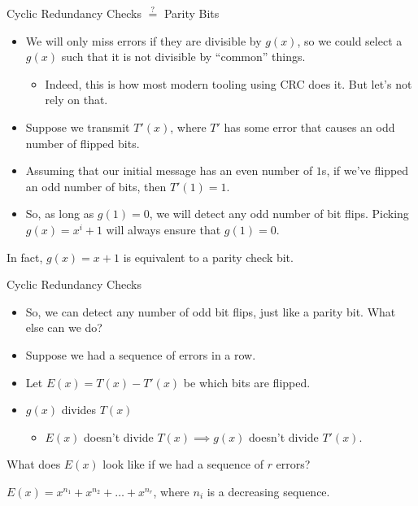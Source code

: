 \documentclass[aspectratio=169]{beamer}
\begin{document}
\begin{frame}{Cyclic Redundancy Checks $\stackrel{?}{=}$ Parity Bits}
    \begin{itemize}
        \item We will only miss errors if they are divisible by $g(x)$, so we could select a $g(x)$ such that it is not divisible by ``common'' things. \pause 
        \begin{itemize}
            \item Indeed, this is how most modern tooling using CRC does it. But let's not rely on that. \pause 
        \end{itemize}
        \item Suppose we transmit $T'(x)$, where $T'$ has some error that causes an odd number of flipped bits. \pause
        \item  Assuming that our initial message has an even number of $1$s, if we've flipped an odd number of bits, then $T'(1) = 1$.
        \item So, as long as $g(1) = 0$, we will detect any odd number of bit flips. Picking $g(x) = x^i + 1$ will always ensure that $g(1) = 0$. \pause 
    \end{itemize} 

    In fact, $g(x) = x + 1$ is equivalent to a parity check bit.  
\end{frame}

\begin{frame}{Cyclic Redundancy Checks}
    \begin{itemize}
        \item So, we can detect any number of odd bit flips, just like a parity bit. What else can we do? 
        \item Suppose we had a sequence of errors in a row. 
        \item Let $E(x) = T(x) - T'(x)$ be which bits are flipped. \pause
        \item $g(x)$ divides $T(x)$ 
        \begin{itemize}
            \item $E(x)$ doesn't divide $T(x) \implies g(x)$ doesn't divide $T'(x)$.
        \end{itemize}
    \end{itemize} \pause

    What does $E(x)$ look like if we had a sequence of $r$ errors? \pause 

    $E(x) = x^{n_1} + x^{n_2} + \ldots + x^{n_r}$, where $n_i$ is a decreasing sequence. 
\end{frame}
\end{document}

